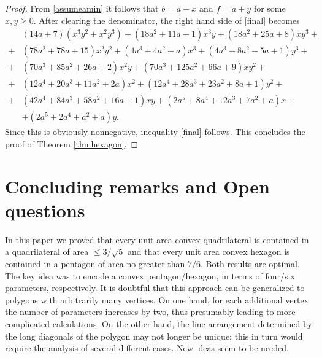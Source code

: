 \documentclass [10pt,oneside]{amsart}
\theoremstyle{definition}
\theoremstyle{plain}
\begin{document}
\begin{proof}
From \eqref{assumeamin} it follows that $b=a+x$ and $f=a+y$ for some $x, y\ge 0$. After clearing the denominator, the right hand side of \eqref{final} becomes
\begin{align*}
&(14a + 7)(x^3y^2+x^2y^3) + (18a^2 + 11a + 1)x^3y + (18a^2 + 25a + 8)xy^3 +\\
+&(78a^2 + 78a + 15)x^2y^2+(4a^3 + 4a^2 + a)x^3 +(4a^3 + 8a^2 + 5a + 1)y^3+\\
+&(70a^3 + 85a^2 + 26a + 2)x^2y+(70a^3 + 125a^2 + 66a + 9)xy^2+\\
+&(12a^4 + 20a^3 + 11a^2 + 2a)x^2 +(12a^4 + 28a^3 + 23a^2 + 8a + 1)y^2+\\
+&(42a^4 + 84a^3 + 58a^2 + 16a + 1)xy+(2a^5 + 8a^4 + 12a^3 + 7a^2 + a)x+\\
&+(2a^5+ 2a^4 + a^2 + a)y.
\end{align*}
Since this is obviously nonnegative, inequality \eqref{final} follows. This concludes the proof of Theorem \ref{thmhexagon}.
\end{proof}

\section{\bf Concluding remarks and Open questions}
In this paper we proved that every unit area convex quadrilateral is contained in a quadrilateral of area $\le 3/\sqrt{5}$ and that every unit area convex hexagon is contained in a pentagon of area no greater than $7/6$. Both results are optimal. The key idea was to encode a convex pentagon/hexagon, in terms of four/six parameters, respectively. It is doubtful that this approach can be generalized to polygons with arbitrarily many vertices. On one hand, for each additional vertex the number of parameters increases by two, thus presumably leading to more complicated calculations. On the other hand, the line arrangement determined by the long diagonals of the polygon may not longer be unique; this in turn would require the analysis of several different cases. New ideas seem to be needed.
\end{document}

